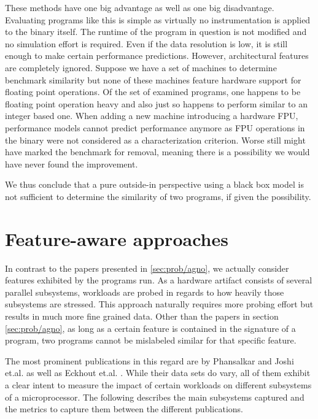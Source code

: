 \documentclass[../bachelor_paper.tex]{subfiles}
\begin{document}
These methods have one big advantage as well as one big disadvantage. Evaluating programs like this is simple as virtually no instrumentation is applied to the binary itself. The runtime of the program in question is not modified and no simulation effort is required. Even if the data resolution is low, it is still enough to make certain performance predictions. However, architectural features are completely ignored. Suppose we have a set of machines to determine benchmark similarity but none of these machines feature hardware support for floating point operations. Of the set of examined programs, one happens to be floating point operation heavy and also just so happens to perform similar to an integer based one. When adding a new machine introducing a hardware \ac{FPU}, performance models cannot predict performance anymore as \ac{FPU} operations in the binary were not considered as a characterization criterion. Worse still \cite{vandierendonckManyBenchmarksStress} might have marked the benchmark for removal, meaning there is a possibility we would have never found the improvement.

We thus conclude that a pure outside-in perspective using a black box model is not sufficient to determine the similarity of two programs, if given the possibility.

\section{Feature-aware approaches}
	\label{sec:prob/aware}
In contrast to the papers presented in \ref{sec:prob/agno}, we actually consider features exhibited by the programs run. As a hardware artifact consists of several parallel subsystems, workloads are probed in regards to how heavily those subsystems are stressed. This approach naturally requires more probing effort but results in much more fine grained data. Other than the papers in section \ref{sec:prob/agno}, as long as a certain feature is contained in the signature of a program, two programs cannot be mislabeled similar for that specific feature.

The most prominent publications in this regard are by Phansalkar and Joshi et.al. \cite{phansalkarMeasuringProgramSimilarity2005,joshiMeasuringBenchmarkSimilarity2006} as well as Eckhout et.al. \cite{eeckhoutQuantifyingImpactInput}. While their data sets do vary, all of them exhibit a clear intent to measure the impact of certain workloads on different subsystems of a microprocessor. The following describes the main subsystems captured and the metrics to capture them between the different publications.
\end{document}

